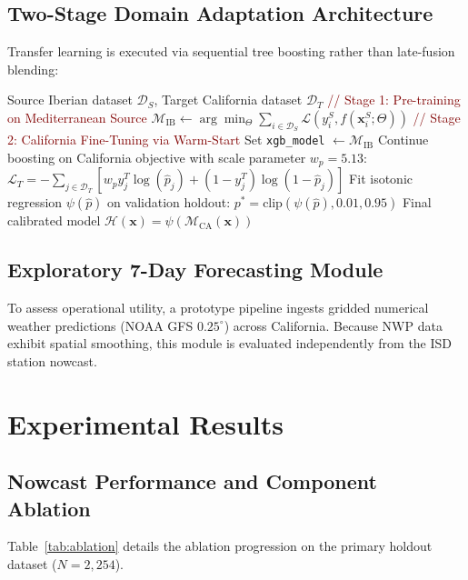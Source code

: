\documentclass[journal]{IEEEtran}
\begin{document}
\subsection{Two-Stage Domain Adaptation Architecture}
Transfer learning is executed via sequential tree boosting rather than late-fusion blending:

\begin{algorithm}[H]
\caption{\color{Burgundy}Sequential XGBoost Domain Adaptation}
\label{alg:transfer}
\begin{algorithmic}[1]
\REQUIRE Source Iberian dataset $\mathcal{D}_S$, Target California dataset $\mathcal{D}_T$
\STATE \textcolor{Maroon}{// Stage 1: Pre-training on Mediterranean Source}
\STATE $\mathcal{M}_{\text{IB}} \leftarrow \arg\min_{\Theta} \sum_{i \in \mathcal{D}_S} \mathcal{L}(y_i^S, f(\mathbf{x}_i^S; \Theta))$
\STATE \textcolor{Maroon}{// Stage 2: California Fine-Tuning via Warm-Start}
\STATE Set \texttt{xgb\_model} $\leftarrow \mathcal{M}_{\text{IB}}$
\STATE Continue boosting on California objective with scale parameter $w_p = 5.13$:
\STATE $\mathcal{L}_T = -\sum_{j \in \mathcal{D}_T} \left[ w_p y_j^T \log(\hat{p}_j) + (1 - y_j^T)\log(1 - \hat{p}_j) \right]$
\STATE Fit isotonic regression $\psi(\hat{p})$ on validation holdout:
\STATE $p^* = \text{clip}\left(\psi(\hat{p}), 0.01, 0.95\right)$
\RETURN Final calibrated model $\mathcal{H}(\mathbf{x}) = \psi(\mathcal{M}_{\text{CA}}(\mathbf{x}))$
\end{algorithmic}
\end{algorithm}

\subsection{Exploratory 7-Day Forecasting Module}
To assess operational utility, a prototype pipeline ingests gridded numerical weather predictions (NOAA GFS $0.25^\circ$) across California. Because NWP data exhibit spatial smoothing, this module is evaluated independently from the ISD station nowcast.

\section{Experimental Results}

\subsection{Nowcast Performance and Component Ablation}
Table~\ref{tab:ablation} details the ablation progression on the primary holdout dataset ($N = 2,254$).
\end{document}
